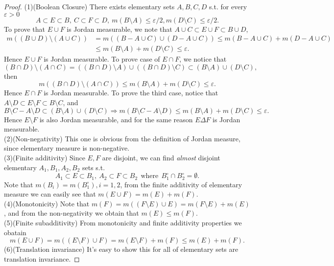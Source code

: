 \documentclass{article}
\begin{document}
\begin{ex}\end{ex}
\begin{proof} 
(1)(Boolean Closure) There exists elementary sets $A, B, C, D$ s.t. for every $\varepsilon > 0$$$
A \subset E \subset B,\ C \subset F \subset D,\ m(B \setminus A) \leq \varepsilon/2, 
m(D \setminus C) \leq \varepsilon / 2.
$$To prove that $E \cup F$ is Jordan measurable, we note that $A \cup C \subset E \cup F \subset B \cup D$,\begin{align*}
m((B \cup D) \setminus (A\cup C)) &= m((B - A \cup C) \cup (D - A \cup C)) \leq 
m(B - A \cup C) + m(D - A \cup C)\\
&\leq m(B \setminus A) + m(D \setminus C) \leq \varepsilon.
\end{align*}
Hence $E \cup F$ is Jordan measurable. To prove case of $E \cap F$, we notice that $$
(B \cap D) \setminus (A \cap C) = ((B \cap D) \setminus A) \cup ((B \cap D) \setminus C) \subset 
(B \setminus A) \cup (D \setminus C),
$$then$$
m((B \cap D) \setminus (A \cap C)) \leq m(B \setminus A) + m(D \setminus C) \leq \varepsilon.
$$Hence $E \cap F$ is Jordan measurable. To prove the third case, notice that $A \setminus D \subset E \setminus F
\subset B \setminus C$, and$$
B \setminus C - A \setminus D \subset (B \setminus A) \cup (D \setminus C) \Rightarrow 
m(B \setminus C - A \setminus D) \leq m(B \setminus A) + m(D \setminus C) \leq \varepsilon.
$$Hence $E \setminus F$ is also Jordan measurable, and for the same reason $E \Delta F$ is Jordan measurable.\\
(2)(Non-negativity) This one is obvious from the definition of Jordan measure, since elementary measure is non-negative.\\
(3)(Finite additivity) Since $E, F$ are disjoint, we can find \emph{almost} disjoint elementary $A_1, B_1, A_2, B_2$ sets 
s.t. $$
A_1 \subset E \subset B_1,\ A_2 \subset F \subset B_2\ \ \text{where}\ \ B_1^{\circ} \cap B_2^{\circ} = \emptyset.
$$Note that $m(B_i) = m(B_1^{\circ}), i = 1, 2$, from the finite additivity of elementary measure we can easily see 
that $m(E \cup F) = m(E) + m(F)$.\\
(4)(Monotonicity) Note that $m(F) = m((F \setminus E) \cup E) = m(F \setminus E) + m(E)$, and from the non-negativity 
we obtain that $m(E) \leq  m(F)$.\\
(5)(Finite subadditivity) From monotonicity and finite additivity properties we obatain $$
m(E \cup F) = m((E \setminus F) \cup F) = m(E \setminus F) + m(F) \leq m(E) + m(F).
$$
(6)(Translation invariance) It's easy to show this for all of elementary sets are translation invariance.
\end{proof}
\end{document}
